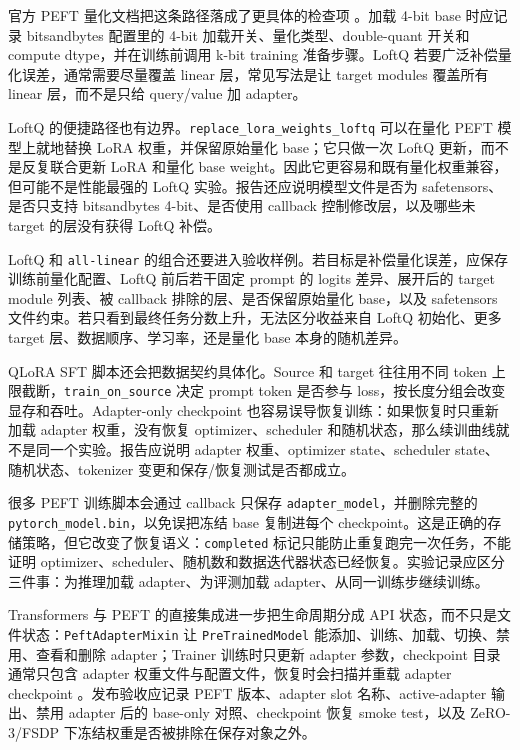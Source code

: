\documentclass[UTF8,zihao=-4,openany]{ctexbook}
\begin{document}
官方 PEFT 量化文档把这条路径落成了更具体的检查项 \cite{huggingface2026peftquantization}。加载 4-bit base 时应记录 bitsandbytes 配置里的 4-bit 加载开关、量化类型、double-quant 开关和 compute dtype，并在训练前调用 k-bit training 准备步骤。LoftQ 若要广泛补偿量化误差，通常需要尽量覆盖 linear 层，常见写法是让 target modules 覆盖所有 linear 层，而不是只给 query/value 加 adapter。

LoftQ 的便捷路径也有边界。\texttt{replace\_lora\_weights\_loftq} 可以在量化 PEFT 模型上就地替换 LoRA 权重，并保留原始量化 base；它只做一次 LoftQ 更新，而不是反复联合更新 LoRA 和量化 base weight。因此它更容易和既有量化权重兼容，但可能不是性能最强的 LoftQ 实验。报告还应说明模型文件是否为 safetensors、是否只支持 bitsandbytes 4-bit、是否使用 callback 控制修改层，以及哪些未 target 的层没有获得 LoftQ 补偿。

LoftQ 和 \texttt{all-linear} 的组合还要进入验收样例。若目标是补偿量化误差，应保存训练前量化配置、LoftQ 前后若干固定 prompt 的 logits 差异、展开后的 target module 列表、被 callback 排除的层、是否保留原始量化 base，以及 safetensors 文件约束。若只看到最终任务分数上升，无法区分收益来自 LoftQ 初始化、更多 target 层、数据顺序、学习率，还是量化 base 本身的随机差异。

QLoRA SFT 脚本还会把数据契约具体化。Source 和 target 往往用不同 token 上限截断，\texttt{train\_on\_source} 决定 prompt token 是否参与 loss，按长度分组会改变显存和吞吐。Adapter-only checkpoint 也容易误导恢复训练：如果恢复时只重新加载 adapter 权重，没有恢复 optimizer、scheduler 和随机状态，那么续训曲线就不是同一个实验。报告应说明 adapter 权重、optimizer state、scheduler state、随机状态、tokenizer 变更和保存/恢复测试是否都成立。

很多 PEFT 训练脚本会通过 callback 只保存 \texttt{adapter\_model}，并删除完整的 \texttt{pytorch\_model.bin}，以免误把冻结 base 复制进每个 checkpoint。这是正确的存储策略，但它改变了恢复语义：\texttt{completed} 标记只能防止重复跑完一次任务，不能证明 optimizer、scheduler、随机数和数据迭代器状态已经恢复。实验记录应区分三件事：为推理加载 adapter、为评测加载 adapter、从同一训练步继续训练。

Transformers 与 PEFT 的直接集成进一步把生命周期分成 API 状态，而不只是文件状态：\texttt{PeftAdapterMixin} 让 \texttt{PreTrainedModel} 能添加、训练、加载、切换、禁用、查看和删除 adapter；Trainer 训练时只更新 adapter 参数，checkpoint 目录通常只包含 adapter 权重文件与配置文件，恢复时会扫描并重载 adapter checkpoint \cite{huggingface2026transformerspeft}。发布验收应记录 PEFT 版本、adapter slot 名称、active-adapter 输出、禁用 adapter 后的 base-only 对照、checkpoint 恢复 smoke test，以及 ZeRO-3/FSDP 下冻结权重是否被排除在保存对象之外。
\end{document}
